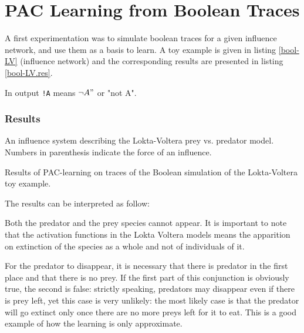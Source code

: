 \documentclass{llncs}
\begin{document}
\section{PAC Learning from Boolean Traces}

A first experimentation was to simulate boolean traces for a given influence network, and use them as a basis to learn. A toy example is given in listing \ref{bool-LV} (influence network) and the corresponding results are presented in listing \ref{bool-LV.res}.

In output \texttt{!A} means $\neg A"$ or "not A".

\subsubsection{Results}

\begin{listfig}[htp]
	
	\vspace{-1em}
	\caption{An influence system describing the Lokta-Voltera prey vs. predator model. Numbers in parenthesis indicate the force of an influence. \label{bool-LV}}
\end{listfig}
\begin{listfig}[htp]
	
	\vspace{-1em}
	\caption{Results of PAC-learning on traces of the Boolean simulation of the Lokta-Voltera toy example.\label{bool-LV.res}}
\end{listfig}

The results can be interpreted as follow:

Both the predator and the prey species cannot appear. It is important to note that the activation functions in the Lokta Voltera models means the apparition on extinction of the species as a whole and not of individuals of it.

For the predator to disappear, it is necessary that there is predator in the first place and that there is no prey. If the first part of this conjunction is obviously true, the second is false: strictly speaking, predators may disappear even if there is prey left, yet this case is very unlikely: the most likely case is that the predator will go extinct only once there are no more preys left for it to eat. This is a good example of how the learning is only approximate.
\end{document}
